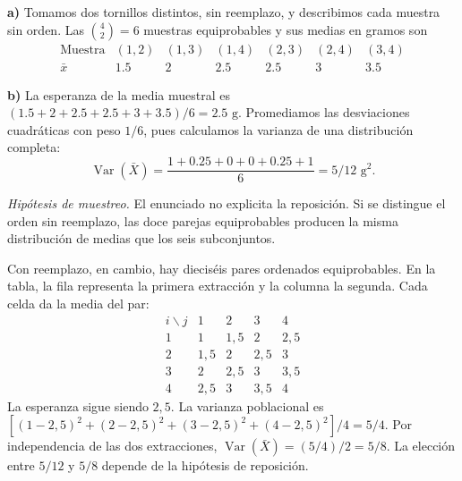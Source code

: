 \textbf{a)} Tomamos dos tornillos distintos, sin reemplazo,
y describimos cada muestra sin orden. Las $\binom42=6$
muestras equiprobables y sus medias en gramos son
\[
\begin{array}{c|rrrrrr}
\text{Muestra}&(1,2)&(1,3)&(1,4)&(2,3)&(2,4)&(3,4)\\\hline
\bar x&1.5&2&2.5&2.5&3&3.5
\end{array}
\]

\textbf{b)} La esperanza de la media muestral es
$(1.5+2+2.5+2.5+3+3.5)/6=\boxed{2.5\text{ g}}$.
Promediamos las desviaciones cuadráticas con peso $1/6$,
pues calculamos la varianza de una distribución completa:
\[
\operatorname{Var}(\bar X)=\frac{1+0.25+0+0+0.25+1}{6}
=\boxed{5/12\text{ g}^2}.
\]


\textit{Hipótesis de muestreo.} El enunciado no explicita la reposición.
Si se distingue el orden sin reemplazo, las doce parejas equiprobables
producen la misma distribución de medias que los seis subconjuntos.

Con reemplazo, en cambio, hay dieciséis pares ordenados equiprobables.
En la tabla, la fila representa la primera extracción y la columna
la segunda. Cada celda da la media del par:
\[
\begin{array}{c|cccc}
i\backslash j&1&2&3&4\\\hline
1&1&1{,}5&2&2{,}5\\
2&1{,}5&2&2{,}5&3\\
3&2&2{,}5&3&3{,}5\\
4&2{,}5&3&3{,}5&4
\end{array}
\]
La esperanza sigue siendo $2{,}5$. La varianza poblacional es
$[(1-2{,}5)^2+(2-2{,}5)^2+(3-2{,}5)^2+(4-2{,}5)^2]/4=5/4$.
Por independencia de las dos extracciones,
$\operatorname{Var}(\bar X)=(5/4)/2=\boxed{5/8}$.
La elección entre $5/12$ y $5/8$ depende de la hipótesis de reposición.
